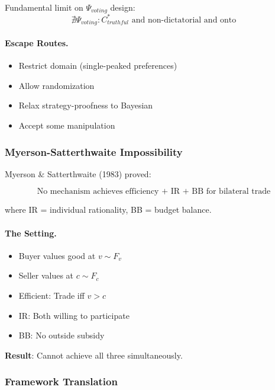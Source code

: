 Fundamental limit on $\Psi_{voting}$ design:
\begin{equation}
\nexists \Psi_{voting}: C^*_{truthful} \text{ and non-dictatorial and onto}
\end{equation}

\paragraph{Escape Routes.}
\begin{itemize}
    \item Restrict domain (single-peaked preferences)
    \item Allow randomization
    \item Relax strategy-proofness to Bayesian
    \item Accept some manipulation
\end{itemize}

\subsubsection{Myerson-Satterthwaite Impossibility}

Myerson \& Satterthwaite (1983) proved:

\begin{equation}
\boxed{
\text{No mechanism achieves efficiency + IR + BB for bilateral trade}
}
\label{eq:myerson-satterthwaite}
\end{equation}

where IR = individual rationality, BB = budget balance.

\paragraph{The Setting.}
\begin{itemize}
    \item Buyer values good at $v \sim F_v$
    \item Seller values at $c \sim F_c$
    \item Efficient: Trade iff $v > c$
    \item IR: Both willing to participate
    \item BB: No outside subsidy
\end{itemize}

\textbf{Result}: Cannot achieve all three simultaneously.

\subsubsection{Framework Translation}

